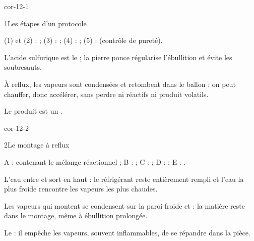 \corrigesSouples

\begin{blocLivre}{cor-12-1}
\begin{corrige}{1}{Les étapes d'un protocole}
\begin{questions}
\item (1) et (2) :  ; (3) :  ; (4) :  ;
(5) :  (contrôle de pureté).
\item L'acide sulfurique est le  ; la pierre ponce régularise l'ébullition et évite les
soubresauts.
\item À reflux, les vapeurs sont condensées et retombent dans le ballon : on peut chauffer, donc accélérer, sans
perdre ni réactifs ni produit volatils.
\item Le produit  est un .
\end{questions}
\end{corrige}
\end{blocLivre}
\begin{blocLivre}{cor-12-2}
\begin{corrige}{2}{Le montage à reflux}
\begin{questions}
\item A :  contenant le mélange réactionnel ; B :  ; C :
 ; D :  ; E : .
\item L'eau entre  et sort en haut : le réfrigérant reste entièrement rempli et l'eau la plus
froide rencontre les vapeurs les plus chaudes.
\item Les vapeurs qui montent se condensent sur la paroi froide et  : la matière
reste dans le montage, même à ébullition prolongée.
\item Le  : il empêche les vapeurs, souvent inflammables, de se répandre dans la pièce.
\end{questions}
\end{corrige}
\end{blocLivre}

